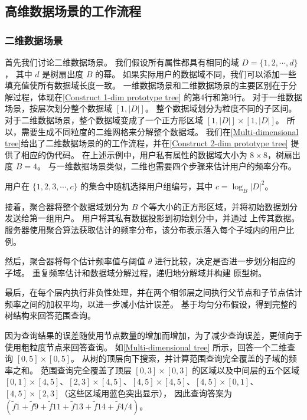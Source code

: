 \subsection{高维数据场景\myahead 的工作流程}
\label{Extension to Multi-dimensional Settings}
\subsubsection{二维数据场景}

首先我们讨论二维数据场景。
我们假设所有属性都具有相同的域 $D = \{1, 2, \cdots, d\}$，
其中 $d$ 是树扇出度 $B$ 的幂。
如果实际用户的数据域不同，我们可以添加一些填充值使所有数据域长度一致。
一维数据场景和二维数据场景的主要区别在于分解过程，体现在\autoref{Construct 1-dim prototype tree} 的第4行和第9行。
对于一维数据场景，\myahead 按层次划分整个数据域 $[1, |D|]$。
整个数据域划分为粒度不同的子区间。
对于二维数据场景，整个数据域变成了一个正方形区域 $[1, |D|] \times [1, |D|]$。
所以，\myahead 需要生成不同粒度的二维网格来分解整个数据域。
我们在\autoref{Multi-dimensional tree}给出了二维数据场景的\myahead 的工作流程，并在\autoref{Construct 2-dim prototype tree} 提供了相应的伪代码。
在上述示例中，用户私有属性的数据域大小为 $8\times8$，树扇出度 $B=4$。
与一维数据场景类似，二维\myahead 也需要四个步骤来估计用户的频率分布。

用户在 $\{1, 2, 3, \cdots, c\}$ 的集合中随机选择用户组编号，其中 $c = \log_B|D|^2$。

接着，聚合器将整个数据域划分为 $B$ 个等大小的正方形区域，并将初始数据划分发送给第一组用户。
用户将其私有数据投影到初始划分中，并通过 \oue 上传其数据。
服务器使用聚合算法获取估计的频率分布，该分布表示落入每个子域内的用户比例。

然后，聚合器将每个估计频率值与阈值 $\theta$ 进行比较，决定是否进一步划分相应的子域。
重复频率估计和数据域分解过程，\myahead 递归地分解域并构建 \myahead 原型树。

最后，\myahead 在每个层内执行非负性处理，并在两个相邻层之间执行父节点和子节点估计频率之间的加权平均，以进一步减小估计误差。
基于均匀分布假设，\myahead 得到完整的树结构来回答范围查询。

因为查询结果的误差随使用节点数量的增加而增加，为了减少查询误差，\myahead 更倾向于使用粗粒度节点来回答查询。
如\autoref{Multi-dimensional tree} 所示，\myahead 回答一个二维查询 $[0,5]\times[0,5]$。 
\myahead 从树的顶层向下搜索，并计算范围查询完全覆盖的子域的频率之和。
范围查询完全覆盖了顶层 $[0,3]\times[0,3]$ 的区域以及中间层的五个区域 $[0,1]\times[4,5]$、$[2,3]\times[4,5]$、$[4,5]\times[4,5]$、$[4,5]\times[0,1]$、$[4,5]\times[2,3]$（这些区域用蓝色突出显示），
因此查询答案为 $(\tilde{f}1 + \tilde{f}9 + \tilde{f}{11} + \tilde{f}{13} + \tilde{f}{14} + \tilde{f}{4}/4)$。

